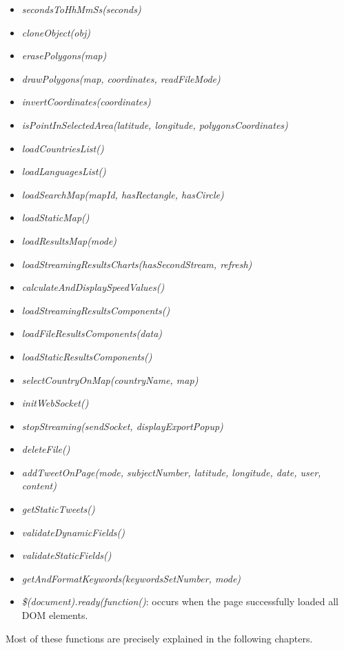 \documentclass[a4paper,11pt]{report}
\begin{document}
\begin{itemize}
	\item \emph{secondsToHhMmSs(seconds)}
	\item \emph{cloneObject(obj)}\cite{elliotbonneville2011}
	\item \emph{erasePolygons(map)}
	\item \emph{drawPolygons(map, coordinates, readFileMode)}
	\item \emph{invertCoordinates(coordinates)}
	\item \emph{isPointInSelectedArea(latitude, longitude, polygonsCoordinates)}\cite{RandolphFranklin2016}
	\item \emph{loadCountriesList()}
	\item \emph{loadLanguagesList()}
	\item \emph{loadSearchMap(mapId, hasRectangle, hasCircle)}
	\item \emph{loadStaticMap()}
	\item \emph{loadResultsMap(mode)}
	\item \emph{loadStreamingResultsCharts(hasSecondStream, refresh)}
	\item \emph{calculateAndDisplaySpeedValues()}
	\item \emph{loadStreamingResultsComponents()}
	\item \emph{loadFileResultsComponents(data)}
	\item \emph{loadStaticResultsComponents()}
	\item \emph{selectCountryOnMap(countryName, map)}
	\item \emph{initWebSocket()}
	\item \emph{stopStreaming(sendSocket, displayExportPopup)}
	\item \emph{deleteFile()}
	\item \emph{addTweetOnPage(mode, subjectNumber, latitude, longitude, date, user, content)}
	\item \emph{getStaticTweets()}
	\item \emph{validateDynamicFields()}
	\item \emph{validateStaticFields()}
	\item \emph{getAndFormatKeywords(keywordsSetNumber, mode)}
	\item \emph{\$(document).ready(function()}: occurs when the page successfully loaded all DOM elements.
\end{itemize}

Most of these functions are precisely explained in the following chapters.
\bigskip
\end{document}
